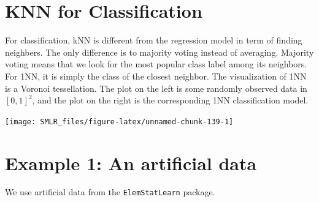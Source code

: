 \documentclass[
]{book}
\newenvironment{Shaded}{\begin{snugshade}}{\end{snugshade}}
\newcommand{\AttributeTok}[1]{\textcolor[rgb]{0.13,0.29,0.53}{#1}}
\newcommand{\ConstantTok}[1]{\textcolor[rgb]{0.56,0.35,0.01}{#1}}
\newcommand{\DecValTok}[1]{\textcolor[rgb]{0.00,0.00,0.81}{#1}}
\newcommand{\FunctionTok}[1]{\textcolor[rgb]{0.13,0.29,0.53}{\textbf{#1}}}
\newcommand{\NormalTok}[1]{#1}
\newcommand{\OtherTok}[1]{\textcolor[rgb]{0.56,0.35,0.01}{#1}}
\newcommand{\SpecialCharTok}[1]{\textcolor[rgb]{0.81,0.36,0.00}{\textbf{#1}}}
\newcommand{\StringTok}[1]{\textcolor[rgb]{0.31,0.60,0.02}{#1}}
\theoremstyle{definition}
\theoremstyle{definition}
\theoremstyle{definition}
\theoremstyle{definition}
\theoremstyle{remark}
\begin{document}
\hypertarget{knn-for-classification}{%
\section{KNN for Classification}\label{knn-for-classification}}

For classification, kNN is different from the regression model in term of finding neighbers. The only difference is to majority voting instead of averaging. Majority voting means that we look for the most popular class label among its neighbors. For 1NN, it is simply the class of the closest neighbor. The visualization of 1NN is a Voronoi tessellation. The plot on the left is some randomly observed data in \([0, 1]^2\), and the plot on the right is the corresponding 1NN classification model.

\begin{center}\texttt{[image: SMLR\_files/figure-latex/unnamed-chunk-139-1]} \end{center}

\hypertarget{example-1-an-artificial-data}{%
\section{Example 1: An artificial data}\label{example-1-an-artificial-data}}

We use artificial data from the \texttt{ElemStatLearn} package.

\begin{Shaded}
\end{Shaded}
\end{document}
